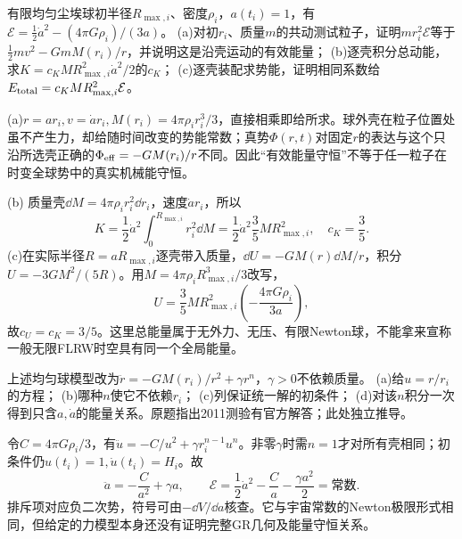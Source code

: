 \begin{exercise}
有限均匀尘埃球初半径$R_{\max,i}$、密度$\rho_i$，$a(t_i)=1$，有$\mathcal E=\tfrac12\dot a^2-(4\pi G\rho_i)/(3a)$。
(a)对初$r_i$、质量$m$的共动测试粒子，证明$m r_i^2\mathcal E$等于$\tfrac12mv^2-GmM(r_i)/r$，并说明这是沿壳运动的有效能量；
(b)逐壳积分总动能，求$K=c_K MR_{\max,i}^2\dot a^2/2$的$c_K$；
(c)逐壳装配求势能，证明相同系数给$E_{\rm total}=c_K MR_{\max,i}^2\mathcal E$。
\end{exercise}
\begin{solution}
(a)$r=ar_i,v=\dot a r_i,M(r_i)=4\pi\rho_i r_i^3/3$，直接相乘即给所求。球外壳在粒子位置处虽不产生力，却给随时间改变的势能常数；真势$\Phi(r,t)$对固定$r$的表达与这个只沿所选壳正确的$\Phi_{\rm eff}=-GM(r_i)/r$不同。因此“有效能量守恒”不等于任一粒子在时变全球势中的真实机械能守恒。

(b) 质量壳$\dd M=4\pi\rho_i r_i^2\dd r_i$，速度$\dot a r_i$，所以
\[
 K=\frac12\dot a^2\int_0^{R_{\max,i}}r_i^2\dd M
 =\frac12\dot a^2\frac35MR_{\max,i}^2,\quad c_K=\frac35.
\]
(c)在实际半径$R=aR_{\max,i}$逐壳带入质量，$\dd U=-GM(r)\dd M/r$，积分$U=-3GM^2/(5R)$。用$M=4\pi\rho_iR_{\max,i}^3/3$改写，
\[
 U=\frac35MR_{\max,i}^2\left(-\frac{4\pi G\rho_i}{3a}\right),
\]
故$c_U=c_K=3/5$。这里总能量属于无外力、无压、有限Newton球，不能拿来宣称一般无限FLRW时空具有同一个全局能量。
\end{solution}

\begin{exercise}
上述均匀球模型改为$\ddot r=-GM(r_i)/r^2+\gamma r^n$，$\gamma>0$不依赖质量。
(a)给$u=r/r_i$的方程；
(b)哪种$n$使它不依赖$r_i$；
(c)列保证统一解的初条件；
(d)对该$n$积分一次得到只含$a,\dot a$的能量关系。原题指出2011测验有官方解答；此处独立推导。
\end{exercise}
\begin{solution}
令$C=4\pi G\rho_i/3$，有$\ddot u=-C/u^2+\gamma r_i^{n-1}u^n$。非零$\gamma$时需$n=1$才对所有壳相同；初条件仍$u(t_i)=1,\dot u(t_i)=H_i$。故
\[
 \ddot a=-\frac C{a^2}+\gamma a,\qquad
 \mathcal E=\frac12\dot a^2-\frac C a-\frac{\gamma a^2}{2}=\text{常数}.
\]
排斥项对应负二次势，符号可由$-\dd V/\dd a$核查。它与宇宙常数的Newton极限形式相同，但给定的力模型本身还没有证明完整GR几何及能量守恒关系。
\end{solution}

